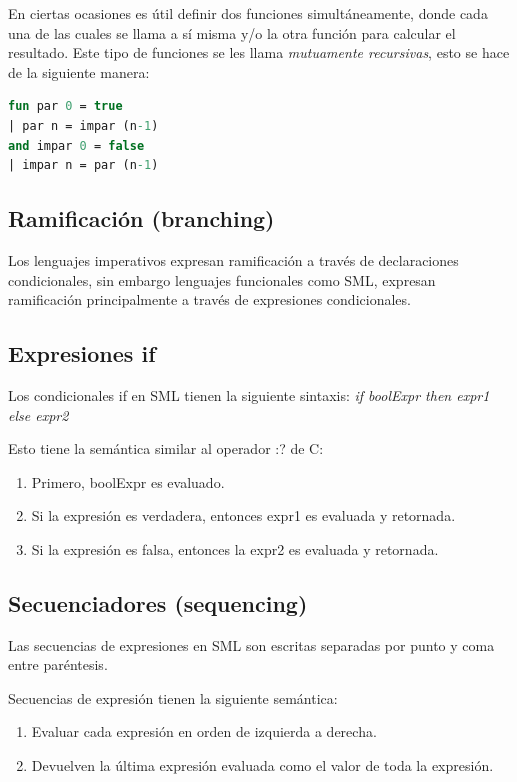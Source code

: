 \documentclass[10pt,journal,compsoc]{IEEEtran}
\begin{document}
En ciertas ocasiones es \'util definir dos funciones simult\'aneamente, donde cada una de las cuales se llama a s\'i misma y/o la otra funci\'on para calcular el resultado. Este tipo de funciones se les llama \textit{mutuamente recursivas}, esto se hace de la siguiente manera:

\begin{lstlisting}[language=ML, caption=Ejemplo Funciones Mutuamente Recursivas]
fun par 0 = true
| par n = impar (n-1)
and impar 0 = false
| impar n = par (n-1)
\end{lstlisting}

\subsection{Ramificaci\'on (branching)}
Los lenguajes imperativos expresan ramificación a trav\'es de declaraciones condicionales, sin embargo lenguajes funcionales como SML, expresan ramificación principalmente a trav\'es de expresiones condicionales.

\subsection{Expresiones if}
Los condicionales if en SML tienen la siguiente sintaxis: \textit{if boolExpr then expr1 else expr2}

Esto tiene la sem\'antica similar al operador :? de C:
\begin{enumerate}
	\item Primero, boolExpr es evaluado.
	\item Si la expresi\'on es verdadera, entonces expr1 es evaluada y retornada.
	\item Si la expresi\'on es falsa, entonces la expr2 es evaluada y retornada.
\end{enumerate}

\subsection{Secuenciadores (sequencing)}
Las secuencias de expresiones en SML son escritas separadas por punto y coma entre par\'entesis.

Secuencias de expresi\'on tienen la siguiente sem\'antica:

\begin{enumerate}
	\item Evaluar cada expresi\'on en orden de izquierda a derecha.
	\item Devuelven la \'ultima expresión evaluada como el valor de toda la expresi\'on.
\end{enumerate}
\end{document}
